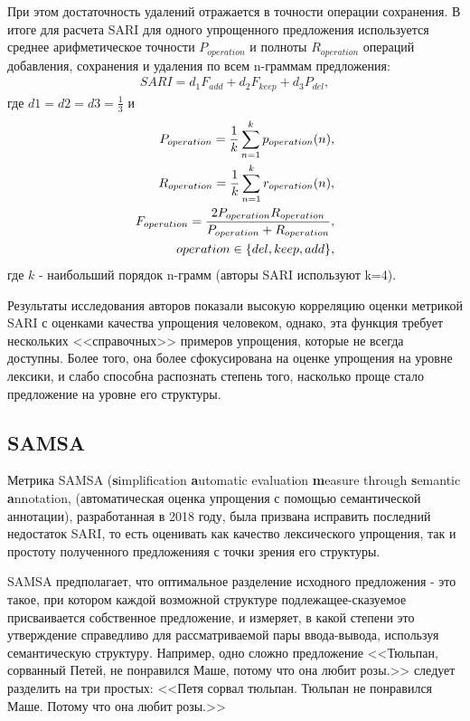 При этом достаточность удалений отражается в точности операции сохранения. 
В итоге для расчета SARI для одного упрощенного предложения используется среднее арифметическое точности $P_{operation}$ и полноты $R_{operation}$ операций добавления, сохранения и удаления по всем n-граммам предложения:
\begin{eqnarray} 
	\label{eq:13}
	SARI = d_{1}F_{add} + d_{2}F_{keep} + d_{3}P_{del} ,
\end{eqnarray}
где $d1 = d2 = d3 = \frac{1}{3}$ и 
\begin{eqnarray} 
	\label{eq:14}
	P_{operation} = \frac{1}{k}\sum\limits_{n=1}^{k}p_{operation}(n) ,\\
	R_{operation} = \frac{1}{k}\sum\limits_{n=1}^{k}r_{operation}(n) ,\\
	F_{operation} = \frac{2P_{operation}R_{operation}}{P_{operation} + R_{operation}},  \\
	operation\in{\left\lbrace del, keep, add\right\rbrace } \notag,
\end{eqnarray}
где $k$ - наибольший порядок n-грамм (авторы SARI используют k=4).

Результаты исследования авторов показали высокую корреляцию оценки метрикой SARI с оценками качества упрощения человеком, однако, эта функция требует нескольких <<справочных>> примеров упрощения, которые не всегда доступны. Более того, она более сфокусирована на оценке упрощения на уровне лексики, и слабо способна распознать степень того, насколько проще стало предложение на уровне его структуры.

\subsection{SAMSA}

Метрика SAMSA (\textbf{s}implification \textbf{a}utomatic evaluation \textbf{m}easure through \textbf{s}emantic \textbf{a}nnotation, (автоматическая оценка упрощения с помощью семантической аннотации), разработанная в 2018 году, была призвана исправить последний недостаток SARI, то есть оценивать как качество лексического упрощения, так и простоту полученного предложенияя с точки зрения его структуры\cite{sulem_semantic_2018}.

SAMSA предполагает, что оптимальное разделение исходного предложения - это такое, при котором каждой возможной структуре подлежащее-сказуемое присваивается собственное предложение, и измеряет, в какой степени это утверждение справедливо для рассматриваемой пары ввода-вывода, используя семантическую структуру. Например, одно сложно предложение <<Тюльпан, сорванный Петей, не понравился Маше, потому что она любит розы.>> следует разделить на три простых: <<Петя сорвал тюльпан. Тюльпан не понравился Маше. Потому что она любит розы.>>

